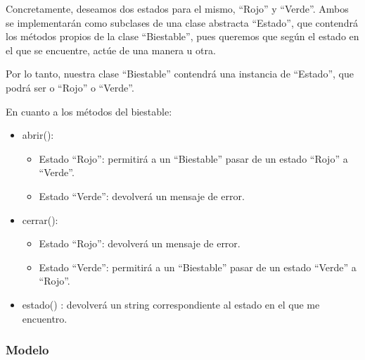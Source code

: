 \documentclass[11pt,a4paper]{article}
\begin{document}
Concretamente, deseamos dos estados para el mismo, ``Rojo'' y ``Verde''. Ambos se implementarán como subclases de una clase abstracta ``Estado'', que contendrá los métodos propios de la clase ``Biestable'', pues queremos que según el estado en el que se encuentre, actúe de una manera u otra.

Por lo tanto, nuestra clase ``Biestable'' contendrá una instancia de ``Estado'', que podrá ser o ``Rojo'' o ``Verde''.

En cuanto a los métodos del biestable:

\begin{itemize}
\item abrir():

	\begin{itemize}
	\item Estado ``Rojo'': permitirá a un ``Biestable'' pasar de un estado ``Rojo'' a ``Verde''.
	\item Estado ``Verde'': devolverá un mensaje de error.
	\end{itemize}
	
\item cerrar():

	\begin{itemize}
	\item Estado ``Rojo'': devolverá un mensaje de error.
	\item Estado ``Verde'':  permitirá a un ``Biestable'' pasar de un estado ``Verde'' a ``Rojo''.

	\end{itemize}
	
\item estado() : devolverá un string correspondiente al estado en el que me encuentro.
\end{itemize}



\subsubsection{Modelo}

\begin{figure}[H]
\end{figure}
\end{document}
